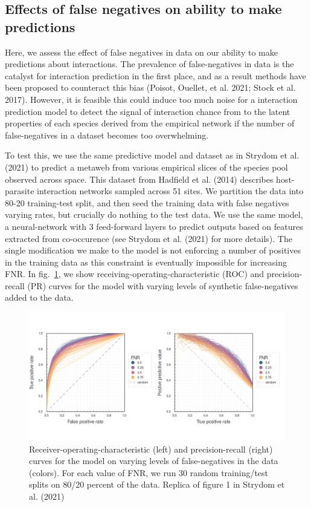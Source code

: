 \documentclass[11pt]{article}
\makeatletter
\def\maxwidth{\ifdim\Gin@nat@width>\linewidth\linewidth
\else\Gin@nat@width\fi}
\let\Oldincludegraphics\includegraphics
\renewcommand{\includegraphics}[1]{\Oldincludegraphics[width=\maxwidth]{#1}}
\makeatother
\begin{document}
\hypertarget{effects-of-false-negatives-on-ability-to-make-predictions}{%
\subsection{Effects of false negatives on ability to make
predictions}\label{effects-of-false-negatives-on-ability-to-make-predictions}}

Here, we assess the effect of false negatives in data on our ability to
make predictions about interactions. The prevalence of false-negatives
in data is the catalyst for interaction prediction in the first place,
and as a result methods have been proposed to counteract this bias
(Poisot, Ouellet, et al. 2021; Stock et al. 2017). However, it is
feasible this could induce too much noise for a interaction prediction
model to detect the signal of interaction chance from to the latent
properties of each species derived from the empirical network if the
number of false-negatives in a dataset becomes too overwhelming.

To test this, we use the same predictive model and dataset as in Strydom
et al. (2021) to predict a metaweb from various empirical slices of the
species pool observed across space. This dataset from Hadfield et al.
(2014) describes host-parasite interaction networks sampled across 51
sites. We partition the data into 80-20 training-test split, and then
seed the training data with false negatives varying rates, but crucially
do nothing to the test data. We use the same model, a neural-network
with 3 feed-forward layers to predict outputs based on features
extracted from co-occurence (see Strydom et al. (2021) for more
details). The single modification we make to the model is not enforcing
a number of positives in the training data as this constraint is
eventually impossible for increasing FNR. In fig.~\ref{fig:rocpr}, we
show receiving-operating-characteristic (ROC) and precision-recall (PR)
curves for the model with varying levels of synthetic false-negatives
added to the data.

\begin{figure}
\hypertarget{fig:rocpr}{%
\centering
\includegraphics{./figures/rocpr_falsenegatives.png}
\caption{Receiver-operating-characteristic (left) and precision-recall
(right) curves for the model on varying levels of false-negatives in the
data (colors). For each value of FNR, we run 30 random training/test
splits on 80/20 percent of the data. Replica of figure 1 in Strydom et
al. (2021)}\label{fig:rocpr}
}
\end{figure}
\end{document}
